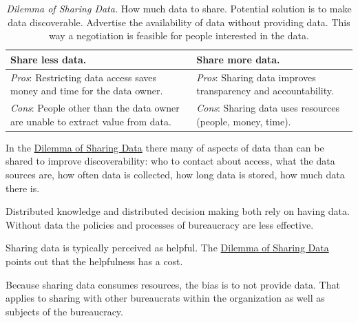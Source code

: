 

\begin{center}
\begin{table}[H] %
\begin{tabular}{ | m{\dilemmatablewidth}| m{\dilemmatablewidth} | } 
  \hline
  \textbf{Share less data.} &
  \textbf{Share more data.} \\
  \hline
  \textit{Pros}: Restricting data access saves money and time for the data owner.&
  \textit{Pros}: Sharing data improves transparency and accountability. \\
  \hline
  \textit{Cons}: People other than the data owner are unable to extract value from data. & 
  \textit{Cons}: Sharing data uses resources (people, money, time). \\
  \hline
\end{tabular}
\caption{
\textit{Dilemma of Sharing Data.}
How much data to share. Potential solution is to make data discoverable. Advertise the availability of data without providing data. This way a negotiation is feasible for people interested in the data.
}
\label{table:data-share-vs-hide}
\end{table}
\end{center}

In the \href{table:data-share-vs-hide}{Dilemma of Sharing Data} there many of aspects of data than can be shared to improve discoverability: who to contact about access, what the data sources are, how often data is collected, how long data is stored, how much data there is.

Distributed knowledge and distributed decision making both rely on having data. Without data the policies and processes of bureaucracy are less effective. 

Sharing data is typically perceived as helpful. 
The \href{table:data-share-vs-hide}{Dilemma of Sharing Data} points out that the helpfulness has a cost. 

Because sharing data consumes resources, the bias is to not provide data. That applies to sharing with other bureaucrats within the organization as well as subjects of the bureaucracy. 



